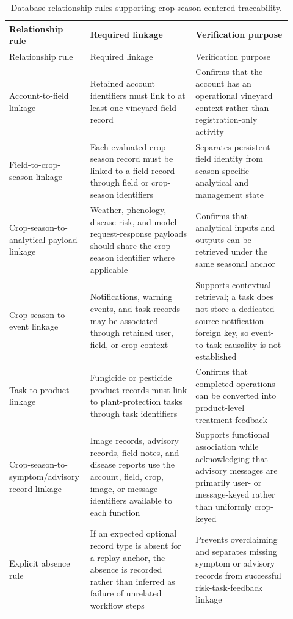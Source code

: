 \documentclass[12pt]{article}
\begin{document}
\begingroup
\setlength{\tabcolsep}{3pt}
\renewcommand{\arraystretch}{1.12}
\begin{longtable}{@{}L{0.23\linewidth} L{0.36\linewidth} L{0.33\linewidth}@{}}
\caption{Database relationship rules supporting crop-season-centered traceability.}\label{tab:supp_database_relationship_rules}\\
\toprule
Relationship rule & Required linkage & Verification purpose \\
\midrule
\endfirsthead
\toprule
Relationship rule & Required linkage & Verification purpose \\
\midrule
\endhead
Account-to-field linkage & Retained account identifiers must link to at least one vineyard field record & Confirms that the account has an operational vineyard context rather than registration-only activity \\
Field-to-crop-season linkage & Each evaluated crop-season record must be linked to a field record through field or crop-season identifiers & Separates persistent field identity from season-specific analytical and management state \\
Crop-season-to-analytical-payload linkage & Weather, phenology, disease-risk, and model request-response payloads should share the crop-season identifier where applicable & Confirms that analytical inputs and outputs can be retrieved under the same seasonal anchor \\
Crop-season-to-event linkage & Notifications, warning events, and task records may be associated through retained user, field, or crop context & Supports contextual retrieval; a task does not store a dedicated source-notification foreign key, so event-to-task causality is not established \\
Task-to-product linkage & Fungicide or pesticide product records must link to plant-protection tasks through task identifiers & Confirms that completed operations can be converted into product-level treatment feedback \\
Crop-season-to-symptom/advisory record linkage & Image records, advisory records, field notes, and disease reports use the account, field, crop, image, or message identifiers available to each function & Supports functional association while acknowledging that advisory messages are primarily user- or message-keyed rather than uniformly crop-keyed \\
Explicit absence rule & If an expected optional record type is absent for a replay anchor, the absence is recorded rather than inferred as failure of unrelated workflow steps & Prevents overclaiming and separates missing symptom or advisory records from successful risk-task-feedback linkage \\
\bottomrule
\end{longtable}
\endgroup
\end{document}

